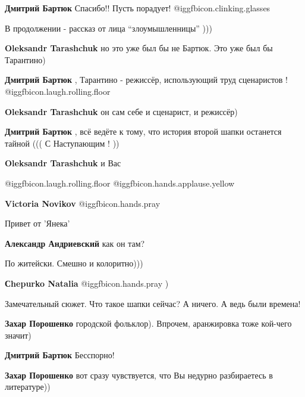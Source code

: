 \begin{itemize}
\begin{itemize}
\textbf{Дмитрий Бартюк} Спасибо!! Пусть порадует!  @igg{fbicon.clinking.glasses} 
\end{itemize} %

В продолжении - рассказ от лица \enquote{злоумышленницы} )))

\begin{itemize} %
\textbf{Oleksandr Tarashchuk} но это уже был бы не Бартюк. Это уже был бы Тарантино)

\begin{itemize} %
\textbf{Дмитрий Бартюк} , Тарантино - режиссёр, использующий труд сценаристов !
 @igg{fbicon.laugh.rolling.floor} 

\textbf{Oleksandr Tarashchuk}
он сам себе и сценарист, и режиссёр)

\textbf{Дмитрий Бартюк} , всё ведёте к тому, что история второй шапки останется тайной (((
С Наступающим ! ))

\textbf{Oleksandr Tarashchuk} и Вас
\end{itemize} %

\end{itemize} %

 @igg{fbicon.laugh.rolling.floor}  @igg{fbicon.hands.applause.yellow} 

\textbf{Victoria Novikov}  @igg{fbicon.hands.pray} 

Привет от 'Янека'

\textbf{Александр Андриевский}
как он там?

По житейски. Смешно и колоритно)))

\textbf{Сhepurko Natalia}  @igg{fbicon.hands.pray} )

Замечательный сюжет.
Что такое шапки сейчас?
А ничего.
А ведь были времена!

\begin{itemize} %
\textbf{Захар Порошенко} городской фольклор). Впрочем, аранжировка тоже кой-чего значит)

\textbf{Дмитрий Бартюк} Бесспорно!

\textbf{Захар Порошенко} вот сразу чувствуется, что Вы недурно разбираетесь в литературе))


\end{itemize}
\end{itemize}

